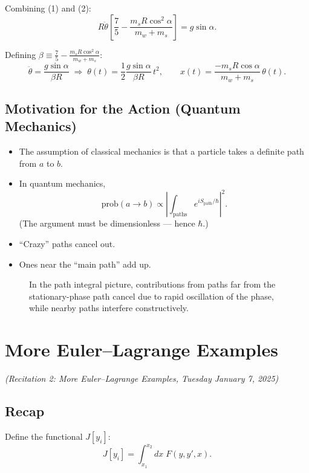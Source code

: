 Combining (1) and (2):
\[
    R\ddot{\theta}\left[\frac{7}{5} - \frac{m_s R\cos^2\alpha}{m_w+m_s}\right]
    = g\sin\alpha.
\]

Defining $\beta \equiv \frac{7}{5} - \frac{m_s R\cos^2\alpha}{m_w+m_s}$:
\[
    \boxed{\ddot{\theta} = \frac{g\sin\alpha}{\beta R}}
    \;\Rightarrow\;
    \theta(t) = \frac{1}{2}\frac{g\sin\alpha}{\beta R}\,t^2,
    \qquad
    \boxed{x(t) = \frac{-m_s R\cos\alpha}{m_w+m_s}\,\theta(t).}
\]

\section{Motivation for the Action (Quantum Mechanics)}

\begin{itemize}
    \item The assumption of classical mechanics is that a particle takes a definite
        path from $a$ to $b$.
    \item In quantum mechanics,
        \[
            \mathrm{prob}(a \to b)
            \propto \left|\int_\text{paths} e^{i S_\text{path}/\hbar}\right|^2.
        \]
        (The argument must be dimensionless — hence $\hbar$.)
    \item ``Crazy'' paths cancel out.
    \item Ones near the ``main path'' add up.
\end{itemize}

\begin{figure}[H]
    \centering
    \caption{In the path integral picture, contributions from paths far from the
    stationary-phase path cancel due to rapid oscillation of the phase, while
    nearby paths interfere constructively.}
\end{figure}

\chapter{More Euler--Lagrange Examples}

\textit{(Recitation 2: More Euler--Lagrange Examples, Tuesday January 7, 2025)}

\section{Recap}

Define the functional $J[y_i]$:
\[
    J[y_i] = \int_{x_1}^{x_2} dx\; F(y, y', x).
\]


